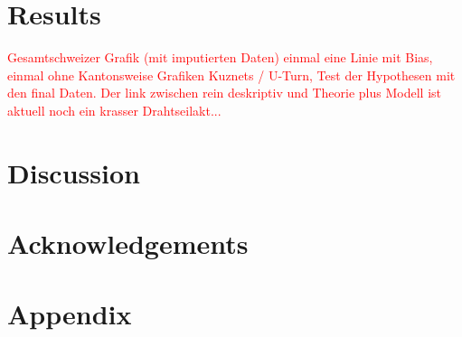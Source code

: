 \documentclass[twoside]{article}\usepackage[]{graphicx}\usepackage[]{color}
\begin{document}
\begin{multicols}{2}

\section{Results}

\textcolor{red}{Gesamtschweizer Grafik (mit imputierten Daten) einmal eine Linie mit Bias, einmal ohne
Kantonsweise Grafiken
Kuznets / U-Turn, Test der Hypothesen mit den final Daten. Der link zwischen rein deskriptiv  und Theorie plus Modell ist aktuell noch ein krasser Drahtseilakt...}





\section{Discussion}

\lipsum[1-4]





\section{Acknowledgements}

\lipsum[4-5]




\end{multicols}

 




\section{Appendix}
\end{document}
